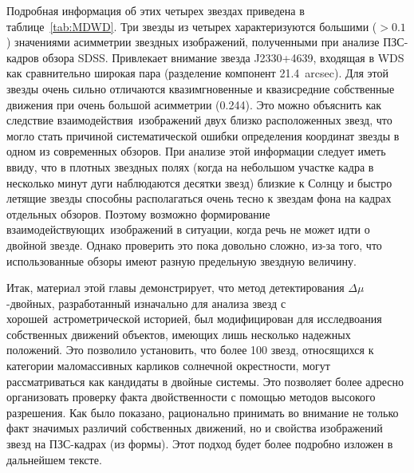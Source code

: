 Подробная информация об этих четырех звездах приведена в таблице~\ref{tab:MDWD}. Три звезды из четырех характеризуются большими ($>0.1$) значениями асимметрии звездных изображений, полученными при анализе ПЗС-кадров обзора SDSS. Привлекает внимание звезда J2330+4639, входящая в WDS как сравнительно широкая пара (разделение компонент 21.4~arcsec). Для этой звезды очень сильно отличаются квазимгновенные и квазисредние собственные движения при очень большой асимметрии (0.244). Это можно объяснить как следствие \glqq взаимодействия\grqq\ изображений двух близко расположенных звезд, что могло стать причиной систематической ошибки определения координат звезды в одном из современных обзоров. При анализе этой информации следует иметь ввиду, что в плотных звездных полях (когда на небольшом участке кадра в несколько минут дуги наблюдаются десятки звезд) близкие к Солнцу и быстро летящие звезды способны располагаться очень тесно к звездам фона на кадрах отдельных обзоров. Поэтому возможно формирование \glqq взаимодействующих\grqq\ изображений в ситуации, когда речь не может идти о двойной звезде. Однако проверить это пока довольно сложно, из-за того, что использованные обзоры имеют разную предельную звездную величину.

Итак, материал этой главы демонстрирует, что метод детектирования $\Delta\mu$-двойных, разработанный изначально для анализа звезд с \glqq хорошей\grqq\ астрометрической историей, был модифицирован для исследвоания собственных движений объектов, имеющих лишь несколько надежных положений. Это позволило установить, что более 100 звезд, относящихся к категории маломассивных карликов солнечной окрестности, могут рассматриваться как кандидаты в двойные системы. Это позволяет более адресно организовать проверку факта двойственности с помощью методов высокого разрешения. Как было показано, рационально принимать во внимание не только факт значимых различий собственных движений, но и свойства изображений звезд на ПЗС-кадрах (из формы). Этот подход будет более подробно изложен в дальнейшем тексте.

